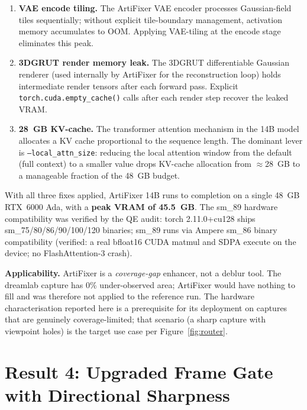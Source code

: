\begin{enumerate}
  \item \textbf{VAE encode tiling.} The ArtiFixer VAE encoder processes Gaussian-field
        tiles sequentially; without explicit tile-boundary management, activation memory
        accumulates to OOM.  Applying VAE-tiling at the encode stage eliminates this peak.
  \item \textbf{3DGRUT render memory leak.} The 3DGRUT differentiable Gaussian renderer
        (used internally by ArtiFixer for the reconstruction loop) holds intermediate render
        tensors after each forward pass.  Explicit \texttt{torch.cuda.empty\_cache()} calls
        after each render step recover the leaked VRAM.
  \item \textbf{28~GB KV-cache.} The transformer attention mechanism in the 14B model
        allocates a KV cache proportional to the sequence length.  The dominant lever is
        \texttt{--local\_attn\_size}: reducing the local attention window from the default
        (full context) to a smaller value drops KV-cache allocation from $\approx$28~GB to
        a manageable fraction of the 48~GB budget.
\end{enumerate}

With all three fixes applied, ArtiFixer 14B runs to completion on a single 48~GB RTX~6000
Ada, with a \textbf{peak VRAM of 45.5~GB}.  The sm\_89 hardware compatibility was verified
by the QE audit: torch 2.11.0+cu128 ships sm\_75/80/86/90/100/120 binaries; sm\_89 runs
via Ampere sm\_86 binary compatibility (verified: a real bfloat16 CUDA matmul and SDPA
execute on the device; no FlashAttention-3 crash).

\textbf{Applicability.} ArtiFixer is a \emph{coverage-gap} enhancer, not a deblur tool.
The dreamlab capture has 0\% under-observed area; ArtiFixer would have nothing to fill
and was therefore not applied to the reference run.  The hardware characterisation
reported here is a prerequisite for its deployment on captures that are genuinely
coverage-limited; that scenario (a sharp capture with viewpoint holes) is the target use
case per Figure~\ref{fig:router}.

\section{Result 4: Upgraded Frame Gate with Directional Sharpness}
\label{sec:results:framegate}

